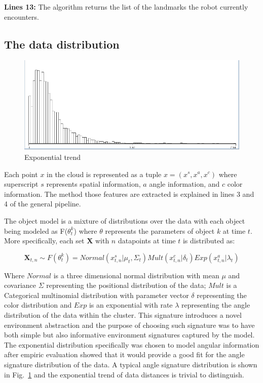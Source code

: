 \documentclass[twoside,hidelinks]{article}
\begin{document}
\textbf{Lines 13:} The algorithm returns the list of the landmarks the robot currently encounters.

\subsection{The data distribution}
\label{data:dist}

\begin{figure}
    \centering
    \includegraphics[width=.35\textwidth]{Kullback-Leibler}
    \caption{Exponential trend}
    \label{pcl:kl}
\end{figure}

Each point $x$ in the cloud is represented as a tuple $x =(x^s, x^a, x^c ) $ where superscript $s$ represents spatial information, $a$ angle information, and $c$ color information. The method those features are extracted is explained in lines 3 and 4 of the general pipeline.

The object model is a mixture of distributions over the data with each object being modeled as F($\theta_t^k$) where $\theta$ represents the parameters of object $k$ at time $t$. More specifically, each set \textbf{X} with $n$ datapoints at time $t$ is distributed as:

\begin{equation}
    \textbf{X}_{t,n} \sim F(\theta_t^k) = Normal(x_{t,n}^s| \mu_t, \Sigma_t) Mult(x_{t,n}^c | \delta_t) Exp(x_{t,n}^a | \lambda_t) 
\end{equation}




Where $Normal$ is a three dimensional normal distribution with mean $\mu$ and covariance $\Sigma$ representing the positional distribution of the data; $Mult$ is a Categorical multinomial distribution with parameter vector $\delta$ representing the color distribution and $Exp$ is an exponential with rate $\lambda$ representing the angle distribution of the data within the cluster. This signature introduces a novel environment abstraction and the purpose of choosing such signature was to have both simple but also informative environment signatures captured by the model. The exponential distribution specifically  was chosen to model angular information after empiric evaluation showed that it would provide a good fit for the angle signature distribution of the data. A typical angle signature distribution is shown in Fig.~\ref{pcl:kl} and the exponential trend of data distances is trivial to distinguish.
\end{document}

